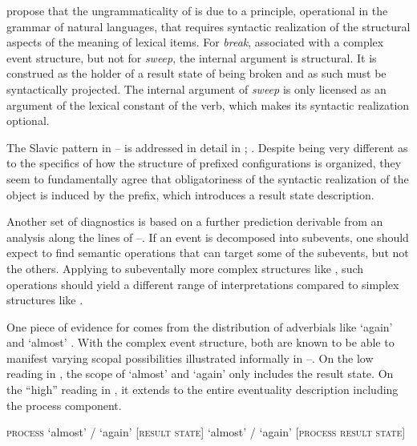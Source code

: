 \documentclass[output=paper,colorlinks,citecolor=brown]{langscibook}
\begin{document}
\citet{Rappaport.Hovav.Levin1998} propose that the ungrammaticality of  is due to a principle, operational in the grammar of natural languages, that requires syntactic realization of the structural aspects of the meaning of lexical items. For \textit{break}, associated with a complex event structure, but not for \textit{sweep}, the internal argument is structural. It is construed as the holder of a result state of being broken and as such must be syntactically projected. The internal argument of \textit{sweep} is only licensed as an  argument of the lexical constant of the verb, which makes its syntactic realization optional.

The Slavic pattern in --
is addressed in detail in \citet[64--68]{BabkoMalaya1999}; \citet{DimitrovaVulchanova1996,Biskup2019}. Despite being very different as to the specifics of how the structure of prefixed configurations is organized, they seem to fundamentally agree that obligatoriness of the syntactic realization of the object is induced by the prefix, which introduces a result state description.

Another set of diagnostics is based on a further prediction derivable from an analysis along the lines of --. If an event is decomposed into subevents, one should expect to find semantic operations that can target some of the subevents, but not the others. Applying to subeventally more complex structures like , such operations should yield a different range of interpretations compared to simplex structures like .

One piece of evidence for  comes from the distribution of adverbials like ‘again’ \citep{Dowty1979,Stechow1996,Beck2005,Lechner.etal2015} and ‘almost’ \citep{Rapp.vonStechow1999}. With the complex event structure, both are known to be able to manifest varying scopal possibilities illustrated informally in --. On the low reading in , the scope of ‘almost’ and ‘again’ only includes the result state. On the “high” reading in , it extends to the entire eventuality description including the process component.

\ea\label{ex:tatevosov:38}
\ea \textsc{process}  ‘almost’ / ‘again’ [\textsc{result} \textsc{state}]\label{ex:tatevosov:38a}
  \ex   ‘almost’ / ‘again’ [\textsc{process}   \textsc{result} \textsc{state}]\label{ex:tatevosov:38b}
  \z
\z
\end{document}

